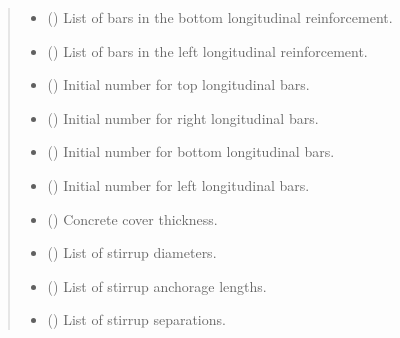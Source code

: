 \documentclass[a4paper,10pt,english]{sphinxmanual}
\begin{document}
\begin{fulllineitems}
\begin{quote}
\begin{description}
\begin{itemize}
\item {} 
\sphinxAtStartPar
{} () \textendash{} List of bars in the bottom longitudinal reinforcement.

\item {} 
\sphinxAtStartPar
{} () \textendash{} List of bars in the left longitudinal reinforcement.

\item {} 
\sphinxAtStartPar
{} () \textendash{} Initial number for top longitudinal bars.

\item {} 
\sphinxAtStartPar
{} () \textendash{} Initial number for right longitudinal bars.

\item {} 
\sphinxAtStartPar
{} () \textendash{} Initial number for bottom longitudinal bars.

\item {} 
\sphinxAtStartPar
{} () \textendash{} Initial number for left longitudinal bars.

\item {} 
\sphinxAtStartPar
{} () \textendash{} Concrete cover thickness.

\item {} 
\sphinxAtStartPar
{} () \textendash{} List of stirrup diameters.

\item {} 
\sphinxAtStartPar
{} () \textendash{} List of stirrup anchorage lengths.

\item {} 
\sphinxAtStartPar
{} () \textendash{} List of stirrup separations.


\end{itemize}
\end{description}
\end{quote}
\end{fulllineitems}
\end{document}
